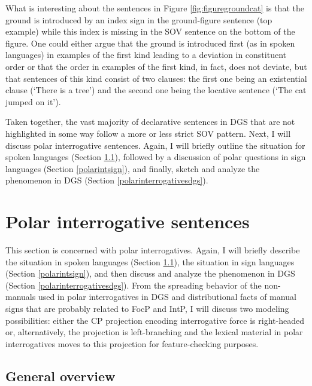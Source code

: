 What is interesting about the sentences in Figure \ref{fig:figuregroundcat} is that the ground is introduced by an index sign in the ground-figure sentence (top example) while this index is missing in the SOV sentence on the bottom of the figure. One could either argue that the ground is introduced first (as in spoken languages) in examples of the first kind leading to a deviation in constituent order or that the order in examples of the first kind, in fact, does not deviate, but that sentences of this kind consist of two clauses: the first one being an existential clause (`There is a tree') and the second one being the locative sentence (`The cat jumped on it'). 

Taken together, the vast majority of declarative sentences in DGS that are not highlighted in some way follow a more or less strict SOV pattern. Next, I will discuss polar interrogative sentences. Again, I will briefly outline the situation for spoken languages (Section \ref{generalpolar}), followed by a discussion of polar questions in sign languages (Section \ref{polarintsign}), and finally, sketch and analyze the phenomenon in DGS (Section \ref{polarinterrogativesdgs}).

\section{Polar interrogative sentences}\label{polargeneralsectionlabel}
This section is concerned with polar interrogatives. Again, I will briefly describe the situation in spoken languages (Section \ref{generalpolar}), the situation in sign languages (Section \ref{polarintsign}), and then discuss and analyze the phenomenon in DGS (Section \ref{polarinterrogativesdgs}). From the spreading behavior of the non-manuals used in polar interrogatives in DGS and distributional facts of manual signs that are probably related to FocP and IntP, I will discuss two modeling possibilities: either the  CP projection encoding interrogative force is right-headed or, alternatively, the projection is left-branching and the lexical material in polar interrogatives moves to this projection for feature-checking purposes. %


\subsection{General overview}\label{generalpolar}

